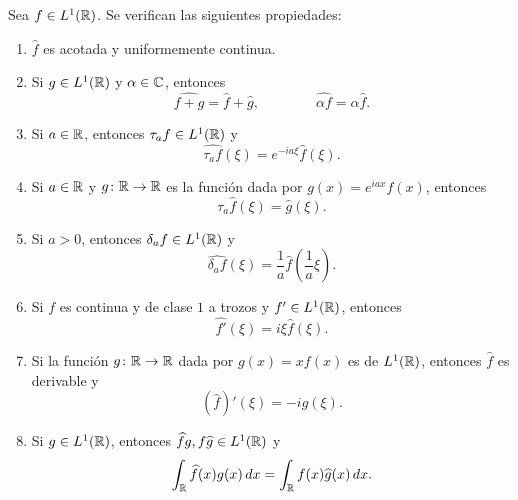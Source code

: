 \documentclass[a4paper, 12pt, extrafontsizes]{memoir}
\begin{document}
\begin{proposition}\label{pro:B.1.2}
    Sea $f \in L^1(\mathbb R)$. Se verifican las siguientes propiedades:
    \begin{enumerate}
        \item $\widehat{f}$ es acotada y uniformemente continua.
        \item Si $g \in L^1(\mathbb R)$ y $\alpha \in \mathbb C$, entonces \[\widehat{f+g} = \widehat{f}+\widehat{g}, \qquad \qquad \widehat{\alpha f} = \alpha \widehat{f}.\]
        \item Si $a \in \mathbb R$, entonces $\tau_af \in L^1(\mathbb R)$ y \[\widehat{\tau_af}(\xi) = e^{-ia\xi}\widehat{f}(\xi).\]
        \item Si $a \in \mathbb R$ y $g \colon \mathbb R \to \mathbb R$ es la función dada por $g(x)= e^{iax}f(x)$, entonces \[\tau_a\widehat{f}(\xi) = \widehat{g}(\xi).\]
        \item Si $a > 0$, entonces $\delta_af \in L^1(\mathbb R)$ y
        \[\widehat{\delta_af}(\xi) = \frac{1}{a}\widehat{f}\left(\frac{1}{a}\xi\right).\]
        \item Si $f$ es continua y de clase $1$ a trozos y $f' \in L^1(\mathbb R)$, entonces \[\widehat{f'}(\xi) = i\xi \widehat{f}(\xi).\]
        \item Si la función $g \colon \mathbb R \to \mathbb R$ dada por $g(x)=xf(x)$ es de $L^1(\mathbb R)$, entonces $\widehat{f}$ es derivable y \[(\widehat{f})'(\xi) = -i\widehat{g}(\xi).\]
        \item Si $g \in L^1(\mathbb R)$, entonces $\widehat{f}g,f\widehat{g} \in L^1(\mathbb R)$ y
        \[\int_\mathbb R \widehat{f}(x)g(x) \, dx = \int_\mathbb R f(x)\widehat{g}(x) \, dx.\]
    \end{enumerate}
\end{proposition}
\end{document}
